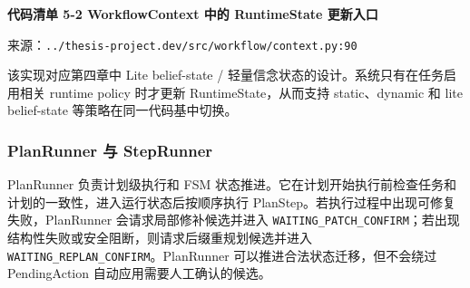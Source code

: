 \textbf{代码清单 5-2 WorkflowContext 中的 RuntimeState 更新入口}

来源：\texttt{../thesis-project.dev/src/workflow/context.py:90}

\begin{Shaded}
\begin{Highlighting}[]
\OperatorTok{{-}\textgreater{}} \NormalTok{:}
    \OperatorTok{=}
     
\OperatorTok{=}
\OperatorTok{=}
\NormalTok{    )}

\OperatorTok{{-}\textgreater{}} \NormalTok{:}
     
    \OperatorTok{=}
\end{Highlighting}
\end{Shaded}

该实现对应第四章中 Lite belief-state /
轻量信念状态的设计。系统只有在任务启用相关 runtime policy 时才更新
RuntimeState，从而支持 static、dynamic 和 lite belief-state
等策略在同一代码基中切换。

\subsubsection{PlanRunner 与
StepRunner}\label{planrunner-ux4e0e-steprunner}

PlanRunner 负责计划级执行和 FSM
状态推进。它在计划开始执行前检查任务和计划的一致性，进入运行状态后按顺序执行
PlanStep。若执行过程中出现可修复失败，PlanRunner
会请求局部修补候选并进入
\texttt{WAITING\_PATCH\_CONFIRM}；若出现结构性失败或安全阻断，则请求后缀重规划候选并进入
\texttt{WAITING\_REPLAN\_CONFIRM}。PlanRunner
可以推进合法状态迁移，但不会绕过 PendingAction
自动应用需要人工确认的候选。

